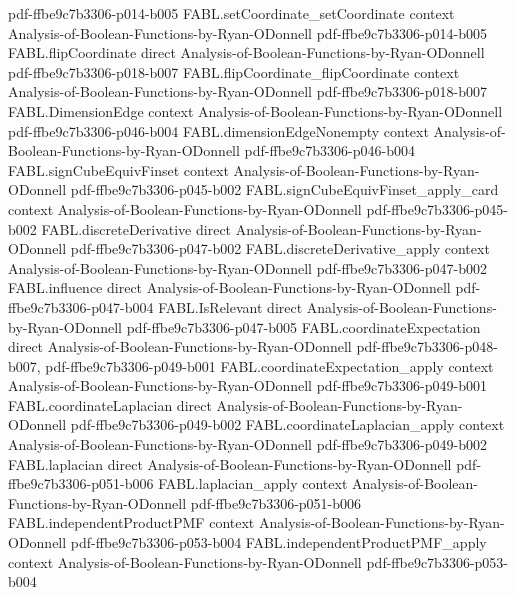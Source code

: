 \begin{theorem}
  {pdf-ffbe9c7b3306-p014-b005}
\proofstep
  {FABL.setCoordinate_setCoordinate}
  {context}
  {Analysis-of-Boolean-Functions-by-Ryan-ODonnell}
  {pdf-ffbe9c7b3306-p014-b005}
\proofstep
  {FABL.flipCoordinate}
  {direct}
  {Analysis-of-Boolean-Functions-by-Ryan-ODonnell}
  {pdf-ffbe9c7b3306-p018-b007}
\proofstep
  {FABL.flipCoordinate_flipCoordinate}
  {context}
  {Analysis-of-Boolean-Functions-by-Ryan-ODonnell}
  {pdf-ffbe9c7b3306-p018-b007}
\proofstep
  {FABL.DimensionEdge}
  {context}
  {Analysis-of-Boolean-Functions-by-Ryan-ODonnell}
  {pdf-ffbe9c7b3306-p046-b004}
\proofstep
  {FABL.dimensionEdgeNonempty}
  {context}
  {Analysis-of-Boolean-Functions-by-Ryan-ODonnell}
  {pdf-ffbe9c7b3306-p046-b004}
\proofstep
  {FABL.signCubeEquivFinset}
  {context}
  {Analysis-of-Boolean-Functions-by-Ryan-ODonnell}
  {pdf-ffbe9c7b3306-p045-b002}
\proofstep
  {FABL.signCubeEquivFinset_apply_card}
  {context}
  {Analysis-of-Boolean-Functions-by-Ryan-ODonnell}
  {pdf-ffbe9c7b3306-p045-b002}
\proofstep
  {FABL.discreteDerivative}
  {direct}
  {Analysis-of-Boolean-Functions-by-Ryan-ODonnell}
  {pdf-ffbe9c7b3306-p047-b002}
\proofstep
  {FABL.discreteDerivative_apply}
  {context}
  {Analysis-of-Boolean-Functions-by-Ryan-ODonnell}
  {pdf-ffbe9c7b3306-p047-b002}
\proofstep
  {FABL.influence}
  {direct}
  {Analysis-of-Boolean-Functions-by-Ryan-ODonnell}
  {pdf-ffbe9c7b3306-p047-b004}
\proofstep
  {FABL.IsRelevant}
  {direct}
  {Analysis-of-Boolean-Functions-by-Ryan-ODonnell}
  {pdf-ffbe9c7b3306-p047-b005}
\proofstep
  {FABL.coordinateExpectation}
  {direct}
  {Analysis-of-Boolean-Functions-by-Ryan-ODonnell}
  {pdf-ffbe9c7b3306-p048-b007,
    pdf-ffbe9c7b3306-p049-b001}
\proofstep
  {FABL.coordinateExpectation_apply}
  {context}
  {Analysis-of-Boolean-Functions-by-Ryan-ODonnell}
  {pdf-ffbe9c7b3306-p049-b001}
\proofstep
  {FABL.coordinateLaplacian}
  {direct}
  {Analysis-of-Boolean-Functions-by-Ryan-ODonnell}
  {pdf-ffbe9c7b3306-p049-b002}
\proofstep
  {FABL.coordinateLaplacian_apply}
  {context}
  {Analysis-of-Boolean-Functions-by-Ryan-ODonnell}
  {pdf-ffbe9c7b3306-p049-b002}
\proofstep
  {FABL.laplacian}
  {direct}
  {Analysis-of-Boolean-Functions-by-Ryan-ODonnell}
  {pdf-ffbe9c7b3306-p051-b006}
\proofstep
  {FABL.laplacian_apply}
  {context}
  {Analysis-of-Boolean-Functions-by-Ryan-ODonnell}
  {pdf-ffbe9c7b3306-p051-b006}
\proofstep
  {FABL.independentProductPMF}
  {context}
  {Analysis-of-Boolean-Functions-by-Ryan-ODonnell}
  {pdf-ffbe9c7b3306-p053-b004}
\proofstep
  {FABL.independentProductPMF_apply}
  {context}
  {Analysis-of-Boolean-Functions-by-Ryan-ODonnell}
  {pdf-ffbe9c7b3306-p053-b004}

\end{theorem}
